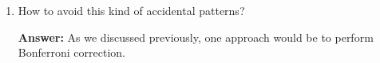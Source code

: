 \documentclass{article}
\newenvironment{QandA}{\begin{enumerate}[label=\arabic*.]}{\end{enumerate}}
\newenvironment{InnerQandA}{\begin{enumerate}[label=\roman*.]}{\end{enumerate}}
\newenvironment{answer}{\par\normalfont \textbf{Answer:}}{}
\begin{document}
\begin{QandA}
\begin{InnerQandA}
\begin{answer}
\begin{align*}
                &= 1 - \prod_{i=1}^m \Pr(\text{no error in test } i) & \text{(iid assumption)}\\
                &= 1 - \prod_{i=1}^m (1 - 1.37 \cdot 10^{-6}) \\
                &= 1 - (0.99999863)^{m} \\
                &= 1 - (0.99999863)^{99990000} \\
                &\approx 1
            \end{align*}
            Therefore, we see that in fact the probability of observing a correlation of $0.8$ or higher, when in fact there is no correlation between the stocks, is close to $1$. 
        \end{answer}

        \item How to avoid this kind of accidental patterns?
        \begin{answer}
            As we discussed previously, one approach would be to perform Bonferroni correction. 
        \end{answer}
    \end{InnerQandA}


\end{QandA}
\end{document}
